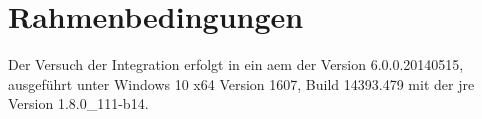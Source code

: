 \section{Rahmenbedingungen}
Der Versuch der Integration erfolgt in ein \ac{aem} der Version 6.0.0.20140515, ausgeführt unter Windows 10 x64 Version 1607, Build 14393.479 mit der \ac{jre} Version 1.8.0\_111-b14.
